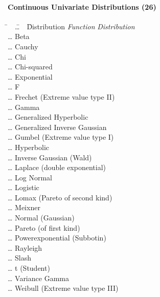 \paragraph{Continuous Univariate Distributions (26)}

\begin{tabbing}
	\hspace*{1em}
	\= ~~\=\ldots~~\=  Distribution \kill
	\> \emph{Function} \> \> \emph{Distribution} \\[1ex]
	\> 	\> \ldots \> Beta \\
	\> 	\> \ldots \> Cauchy \\
	\> 	\> \ldots \> Chi \\
	\> 	\> \ldots \> Chi-squared \\
	\> 	\> \ldots \> Exponential \\
	\> 	\> \ldots \> F \\
	\> 	\> \ldots \> Frechet (Extreme value type II) \\
	\> 	\> \ldots \> Gamma \\
	\> 	\> \ldots \> Generalized Hyperbolic \\
	\> 	\> \ldots \> Generalized Inverse Gaussian \\
	\> 	\> \ldots \> Gumbel (Extreme value type I) \\
	\> 	\> \ldots \> Hyperbolic \\
	\> 	\> \ldots \> Inverse Gaussian (Wald) \\
	\> 	\> \ldots \> Laplace (double exponential) \\
	\> 	\> \ldots \> Log Normal \\
	\> 	\> \ldots \> Logistic \\
	\> 	\> \ldots \> Lomax (Pareto of second kind) \\
	\> 	\> \ldots \> Meixner \\
	\> 	\> \ldots \> Normal (Gaussian) \\
	\> 	\> \ldots \> Pareto (of first kind) \\
	\> 	\> \ldots \> Powerexponential (Subbotin) \\
	\> 	\> \ldots \> Rayleigh \\
	\> 	\> \ldots \> Slash \\
	\> 	\> \ldots \> t (Student) \\
	\> 	\> \ldots \> Variance Gamma \\
	\> 	\> \ldots \> Weibull (Extreme value type III) \\
\end{tabbing}

